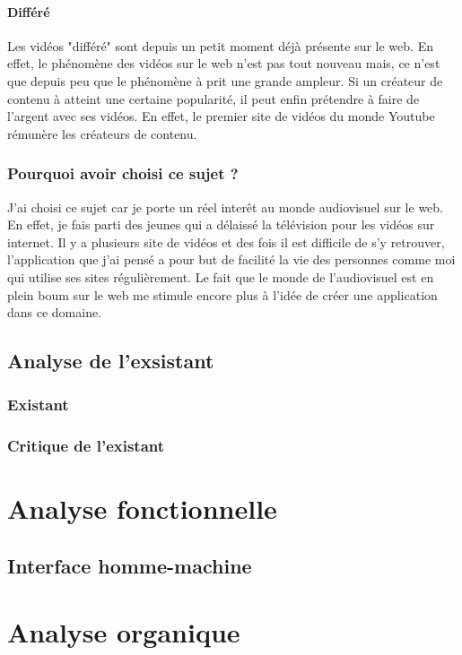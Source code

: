 \documentclass[11pt]{report} %
\begin{document}
			\subsubsection{Différé}
			Les vidéos "différé" sont depuis un petit moment déjà présente sur le web. En effet, le phénomène des vidéos sur le web n'est pas tout nouveau mais, ce n'est que depuis peu que le phénomène à prit une grande ampleur. Si un créateur de contenu à atteint une certaine popularité, il peut enfin prétendre à faire de l'argent avec ses vidéos. En effet, le premier site de vidéos du monde Youtube rémunère les créateurs de contenu.

		\subsection{Pourquoi avoir choisi ce sujet ?}
		J'ai choisi ce sujet car je porte un réel interêt au monde audiovisuel sur le web. En effet, je fais parti des jeunes qui a délaissé la télévision pour les vidéos sur internet. Il y a plusieurs site de vidéos et des fois il est difficile de s'y retrouver, l'application que j'ai pensé a pour but de facilité la vie des personnes comme moi qui utilise ses sites régulièrement. Le fait que le monde de l'audiovisuel est en plein boum sur le web me stimule encore plus à l'idée de créer une application dans ce domaine.
	\section{Analyse de l'exsistant}
		\subsection{Existant}
		\subsection{Critique de l'existant}	

\chapter{Analyse fonctionnelle}
	\section{Interface homme-machine}

\chapter{Analyse organique}
\end{document}
